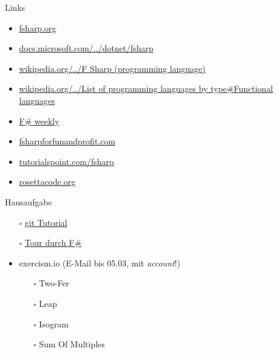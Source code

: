 \documentclass[t]{beamer}
\begin{document}
\begin{frame}[label={sec:orge676943}]{Links}
\begin{itemize}
\item \href{https://fsharp.org/}{fsharp.org}
\item \href{https://docs.microsoft.com/de-de/dotnet/fsharp/}{docs.microsoft.com/../dotnet/fsharp}
\item \href{https://en.wikipedia.org/wiki/F\_Sharp\_(programming\_language)}{wikipedia.org/../F Sharp (programming language)}
\item \href{https://en.wikipedia.org/wiki/List\_of\_programming\_languages\_by\_type\#Functional\_languages}{wikipedia.org/../List of programming languages by type\#Functional languages}
\item \href{https://sergeytihon.com/}{F\# weekly}
\item \href{https://fsharpforfunandprofit.com/}{fsharpforfunandprofit.com}
\item \href{https://www.tutorialspoint.com/fsharp/index.htm}{tutorialspoint.com/fsharp}
\item \href{http://www.rosettacode.org/}{rosettacode.org}
\end{itemize}
\end{frame}

\begin{frame}[label={sec:org221c19c}]{Hausaufgabe}
\begin{itemize}
\item[{$\square$}] \href{https://git-scm.com/docs/gittutorial}{git Tutorial}
\item[{$\square$}] \href{https://docs.microsoft.com/de-de/dotnet/fsharp/tour}{Tour durch F\#}
\item exercism.io (E-Mail bis 05.03, mit \emph{account}!)
\begin{itemize}
\item[{$\square$}] Two-Fer
\item[{$\square$}] Leap
\item[{$\square$}] Isogram
\item[{$\square$}] Sum Of Multiples
\end{itemize}
\end{itemize}
\end{frame}
\end{document}
